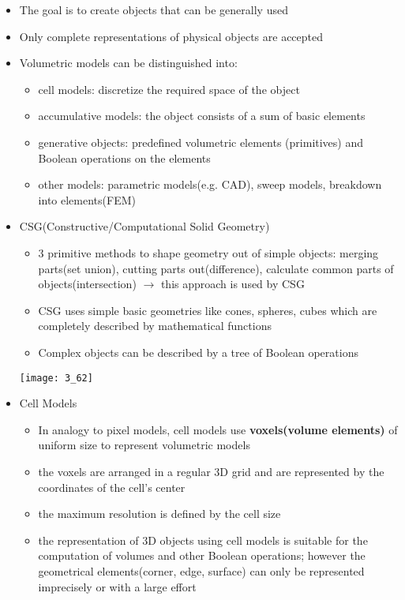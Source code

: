 \documentclass{standalone}
\begin{document}
\begin{itemize}
	\item The goal is to create objects that can be generally used 
	\item Only complete representations of physical objects are accepted
	\item Volumetric models can be distinguished into: 
		\begin{itemize}
			\item cell models: discretize the required space of the object 
			\item accumulative models: the object consists of a sum of basic elements 
			\item generative objects: predefined volumetric elements (primitives) and Boolean operations on the elements 
			\item other models: parametric models(e.g. CAD), sweep models, breakdown into elements(FEM)
		\end{itemize}
	\item CSG(Constructive/Computational Solid Geometry)
	\begin{itemize}
		\item 3 primitive methods to shape geometry out of simple objects: merging parts(set union), cutting parts out(difference), calculate common parts of objects(intersection) $\rightarrow$ this approach is used by CSG
		\item CSG uses simple basic geometries like cones, spheres, cubes which are completely described by mathematical functions
		\item Complex objects can be described by a tree of Boolean operations		
	\end{itemize}
	\texttt{[image: 3\_62]}
	\item Cell Models
	\begin{itemize}
		\item In analogy to pixel models, cell models use \textbf{voxels(volume elements)} of uniform size to represent volumetric models
		\item the voxels are arranged in a regular 3D grid and are represented by the coordinates of the cell's center
		\item the maximum resolution is defined by the cell size
		\item the representation of 3D objects using cell models is suitable for the computation of volumes and other Boolean operations; however the geometrical elements(corner, edge, surface) can only be represented imprecisely or with a large effort
	\end{itemize}
\end{itemize}
\end{document}
